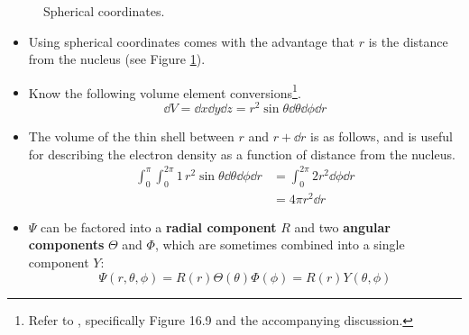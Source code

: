 \documentclass[../notes.tex]{subfiles}
\begin{document}
\begin{itemize}
\begin{figure}[h!]
        \caption{Spherical coordinates.}
        \label{fig:sphericalCoords}
    \end{figure}
    \begin{itemize}
        \item Using spherical coordinates comes with the advantage that $r$ is the distance from the nucleus (see Figure \ref{fig:sphericalCoords}).
        \pagebreak
        \item Know the following volume element conversions\footnote{Refer to \textcite{bib:CAAGThomasNotes}, specifically Figure 16.9 and the accompanying discussion.}.
        \begin{equation*}
            \dd{V} = \dd{x}\dd{y}\dd{z}
            = r^2\sin\theta\dd{\theta}\dd{\phi}\dd{r}
        \end{equation*}
        \item The volume of the thin shell between $r$ and $r+\dd{r}$ is as follows, and is useful for describing the electron density as a function of distance from the nucleus.
        \begin{align*}
            \int_0^\pi\int_0^{2\pi}1\, r^2\sin\theta\dd{\theta}\dd{\phi}\dd{r} &= \int_0^{2\pi}2r^2\dd{\phi}\dd{r}\\
            &= 4\pi r^2\dd{r}
        \end{align*}
        \item $\Psi$ can be factored into a \textbf{radial component} $R$ and two \textbf{angular components} $\Theta$ and $\Phi$, which are sometimes combined into a single component $Y$:
        \begin{equation*}
            \Psi(r,\theta,\phi) = R(r)\Theta(\theta)\Phi(\phi) = R(r)Y(\theta,\phi)

\end{equation*}
\end{itemize}
\end{itemize}
\end{document}
